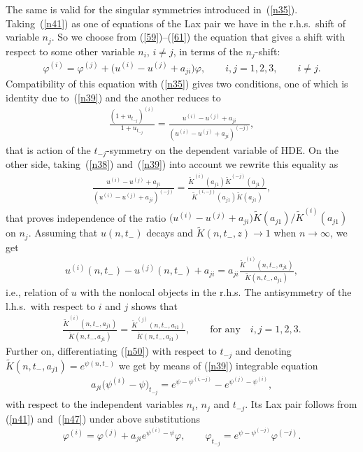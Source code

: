\documentclass[pdftex]{sigma}
\numberwithin{equation}{section}
\begin{document}
The same is valid for the singular symmetries introduced in~(\ref{n35}). Taking~(\ref{n41}) as one of equations of the Lax pair we have in the r.h.s.\ shift of variable $n_j$. So we choose from \mbox{(\ref{59})--(\ref{61})} the equation that gives a shift with respect to some other variable $n_i$, $i\neq{j}$, in terms of the $n_j$-shift:
\begin{gather}
\varphi^{(i)}=\varphi^{(j)}+\big(u^{(i)}-u^{(j)}+a_{ji}\big)\varphi,\qquad i,j=1,2,3,\qquad i\neq{j}.\label{n47}
\end{gather}
Compatibility of this equation with (\ref{n35}) gives two conditions, one of which is identity due to~(\ref{n39}) and the another reduces to
\begin{gather}
 \frac{(1+u_{t_{-j}})^{(i)}}{1+u_{t_{-j}}}=\frac{u^{(i)}-u^{(j)}+a_{ji}}{(u^{(i)}-u^{(j)}+a_{ji})^{(-j)}},\label{n48}
\end{gather}
that is action of the $t_{-j}$-symmetry on the dependent variable of HDE. On the other side, taking~(\ref{n38}) and~(\ref{n39}) into account we rewrite this equality as
\begin{gather*}
\frac{u^{(i)}-u^{(j)}+a_{ji}}{(u^{(i)}-u^{(j)}+a_{ji})^{(-j)}}=
\frac{\widetilde{K}^{(i)}(a_{j1})\widetilde{K}^{(-j)}(a_{j1})}{\widetilde{K}^{(i,-j)}(a_{j1})\widetilde{K}(a_{j1})},%
\end{gather*}
that proves independence of the ratio $\big(u^{(i)}-u^{(j)}+a_{ji}\big)\widetilde{K}(a_{j1})/\widetilde{K}^{(i)}(a_{j1})$ on $n_j$. Assuming that $u(n,t_{-})$ decays and $\widetilde{K}(n,t_{-},z)\to1$ when $n\to\infty$, we get
\begin{gather}
u^{(i)}(n,t_{-})-u^{(j)}(n,t_{-})+a_{ji}=a_{ji}\frac{\widetilde{K}^{(i)}(n,t_{-},a_{j1})}{\widetilde{K}(n,t_{-},a_{j1})},\label{n50}
\end{gather}
i.e., relation of $u$ with the nonlocal objects in the r.h.s. The antisymmetry of the l.h.s.\ with respect to $i$ and $j$
shows that
\begin{gather*}
\frac{\widetilde{K}^{(i)}(n,t_{-},a_{j1})}{\widetilde{K}(n,t_{-},a_{j1})}=
\frac{\widetilde{K}^{(j)}(n,t_{-},a_{i1})}{\widetilde{K}(n,t_{-},a_{i1})},\qquad
\text{for any} \quad i,j=1,2,3.%
\end{gather*}
Further on, dif\/ferentiating (\ref{n50}) with respect to $t_{-j}$ and denoting $\widetilde{K}(n,t_{-},a_{j1})=e^{\psi(n,t_{-})}$ we get by means of (\ref{n39}) integrable equation
\begin{gather*}
 a_{ji}\big(\psi^{(i)}-\psi\big)_{t_{-j}}=e^{\psi-\psi^{(i,-j)}}-e^{\psi^{(j)}-\psi^{(i)}},%
\end{gather*}
with respect to the independent variables $n_i$, $n_j$ and $t_{-j}$. Its Lax pair follows from (\ref{n41}) and~(\ref{n47}) under above substitutions
\begin{gather*}
 \varphi^{(i)}=\varphi^{(j)}+a_{ji}e^{\psi^{(i)}-\psi}\varphi,\qquad %
 \varphi_{t_{-j}}=e^{\psi-\psi^{(-j)}}\varphi^{(-j)}.%
\end{gather*}
\end{document}
